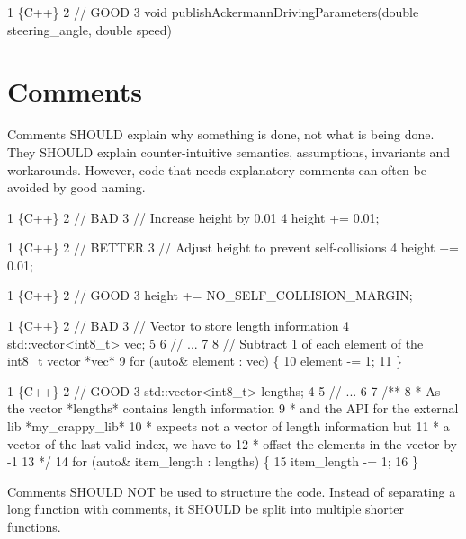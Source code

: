 \begin{DoxyCode}
1 \{C++\}
2 // GOOD
3 void publishAckermannDrivingParameters(double steering\_angle, double speed)
\end{DoxyCode}


\section*{Comments}

Comments S\+H\+O\+U\+LD explain why something is done, not what is being done. They S\+H\+O\+U\+LD explain counter-\/intuitive semantics, assumptions, invariants and workarounds. However, code that needs explanatory comments can often be avoided by good naming.


\begin{DoxyCode}
1 \{C++\}
2 // BAD
3 // Increase height by 0.01
4 height += 0.01;
\end{DoxyCode}



\begin{DoxyCode}
1 \{C++\}
2 // BETTER
3 // Adjust height to prevent self-collisions
4 height += 0.01;
\end{DoxyCode}



\begin{DoxyCode}
1 \{C++\}
2 // GOOD
3 height += NO\_SELF\_COLLISION\_MARGIN;
\end{DoxyCode}



\begin{DoxyCode}
1 \{C++\}
2 // BAD
3 // Vector to store length information
4 std::vector<int8\_t> vec;
5 
6 // ...
7 
8 // Subtract 1 of each element of the int8\_t vector *vec*
9 for (auto& element : vec) \{
10     element -= 1;
11 \}
\end{DoxyCode}



\begin{DoxyCode}
1 \{C++\}
2 // GOOD
3 std::vector<int8\_t> lengths;
4 
5 // ...
6 
7 /**
8  *   As the vector *lengths* contains length information
9  *   and the API for the external lib *my\_crappy\_lib*
10  *   expects not a vector of length information but
11  *   a vector of the last valid index, we have to 
12  *   offset the elements in the vector by -1
13  */
14 for (auto& item\_length : lengths) \{
15     item\_length -= 1;
16 \}
\end{DoxyCode}


Comments S\+H\+O\+U\+LD N\+OT be used to structure the code. Instead of separating a long function with comments, it S\+H\+O\+U\+LD be split into multiple shorter functions.

